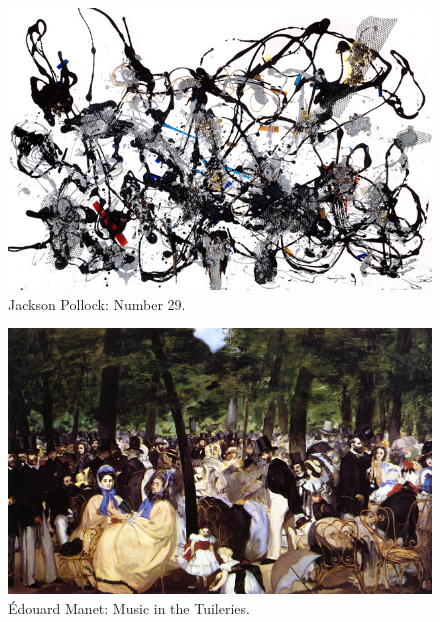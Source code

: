 \begin{figure}[H]
    \centering
    \includegraphics[scale=0.5]{Graphics/Assignment3/outlier.png}
    \caption{Jackson Pollock: Number 29.}
    \label{fig:outlier}
\end{figure}

\begin{figure}[H]
    \centering
    \includegraphics[scale=0.3]{Graphics/Assignment3/manet.png}
    \caption{Édouard Manet: Music in the Tuileries.}
    \label{fig:manet}
\end{figure}



